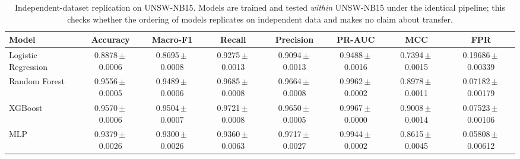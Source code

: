 \begin{table}[htbp]
\centering
\caption{Independent-dataset replication on UNSW-NB15. Models are trained and tested \emph{within} UNSW-NB15 under the identical pipeline; this checks whether the ordering of models replicates on independent data and makes no claim about transfer.}
\label{tab:unsw}
\scriptsize
\begin{tabular}{lccccccc}
\hline
Model & Accuracy & Macro-F1 & Recall & Precision & PR-AUC & MCC & FPR \\
\hline
Logistic Regression & 0.8878\,$\pm$\,0.0006 & 0.8695\,$\pm$\,0.0008 & 0.9275\,$\pm$\,0.0013 & 0.9094\,$\pm$\,0.0013 & 0.9488\,$\pm$\,0.0016 & 0.7394\,$\pm$\,0.0015 & 0.19686\,$\pm$\,0.00339 \\
Random Forest & 0.9556\,$\pm$\,0.0005 & 0.9489\,$\pm$\,0.0006 & 0.9685\,$\pm$\,0.0008 & 0.9664\,$\pm$\,0.0008 & 0.9962\,$\pm$\,0.0002 & 0.8978\,$\pm$\,0.0011 & 0.07182\,$\pm$\,0.00179 \\
XGBoost & 0.9570\,$\pm$\,0.0006 & 0.9504\,$\pm$\,0.0007 & 0.9721\,$\pm$\,0.0008 & 0.9650\,$\pm$\,0.0005 & 0.9967\,$\pm$\,0.0000 & 0.9008\,$\pm$\,0.0014 & 0.07523\,$\pm$\,0.00106 \\
MLP & 0.9379\,$\pm$\,0.0026 & 0.9300\,$\pm$\,0.0026 & 0.9360\,$\pm$\,0.0063 & 0.9717\,$\pm$\,0.0027 & 0.9944\,$\pm$\,0.0002 & 0.8615\,$\pm$\,0.0045 & 0.05808\,$\pm$\,0.00612 \\
\hline
\end{tabular}
\end{table}
